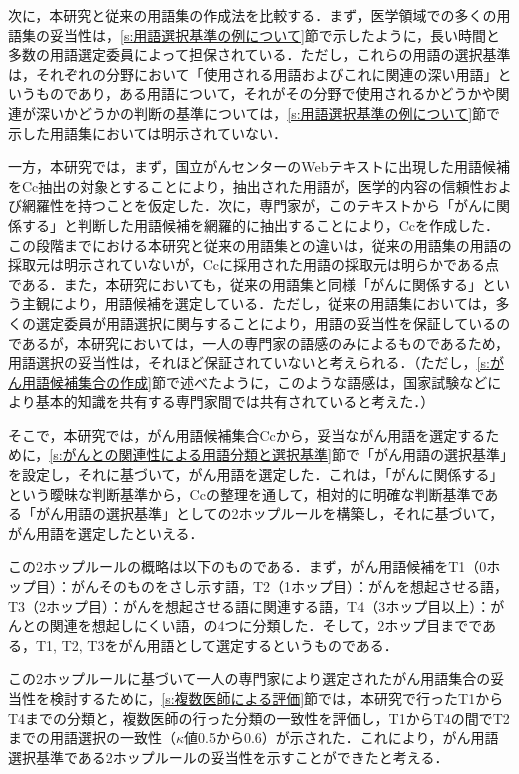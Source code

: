 \documentclass[japanese]{jnlp_1.4}
\begin{document}
次に，本研究と従来の用語集の作成法を比較する．まず，医学領域での多くの用語集の妥当性は，\ref{s:用語選択基準の例について}節で示したように，長い時間と多数の用語選定委員によって担保されている．ただし，これらの用語の選択基準は，それぞれの分野において「使用される用語およびこれに関連の深い用語」というものであり，ある用語について，それがその分野で使用されるかどうかや関連が深いかどうかの判断の基準については，\ref{s:用語選択基準の例について}節で示した用語集においては明示されていない．

一方，本研究では，まず，国立がんセンターのWebテキストに出現した用語候補をCc抽出の対象とすることにより，抽出された用語が，医学的内容の信頼性および網羅性を持つことを仮定した．次に，専門家が，このテキストから「がんに関係する」と判断した用語候補を網羅的に抽出することにより，Ccを作成した．この段階までにおける本研究と従来の用語集との違いは，従来の用語集の用語の採取元は明示されていないが，Ccに採用された用語の採取元は明らかである点である．また，本研究においても，従来の用語集と同様「がんに関係する」という主観により，用語候補を選定している．ただし，従来の用語集においては，多くの選定委員が用語選択に関与することにより，用語の妥当性を保証しているのであるが，本研究においては，一人の専門家の語感のみによるものであるため，用語選択の妥当性は，それほど保証されていないと考えられる．（ただし，\ref{s:がん用語候補集合の作成}節で述べたように，このような語感は，国家試験などにより基本的知識を共有する専門家間では共有されていると考えた．）

そこで，本研究では，がん用語候補集合Ccから，妥当ながん用語を選定するために，\ref{s:がんとの関連性による用語分類と選択基準}節で「がん用語の選択基準」を設定し，それに基づいて，がん用語を選定した．これは，「がんに関係する」という曖昧な判断基準から，Ccの整理を通して，相対的に明確な判断基準である「がん用語の選択基準」としての2ホップルールを構築し，それに基づいて，がん用語を選定したといえる．

この2ホップルールの概略は以下のものである．まず，がん用語候補をT1（0ホップ目）：がんそのものをさし示す語，T2（1ホップ目）：がんを想起させる語，T3（2ホップ目）：がんを想起させる語に関連する語，T4（3ホップ目以上）：がんとの関連を想起しにくい語，の4つに分類した．そして，2ホップ目までである，T1, T2, T3をがん用語として選定するというものである．

この2ホップルールに基づいて一人の専門家により選定されたがん用語集合の妥当性を検討するために，\ref{s:複数医師による評価}節では，本研究で行ったT1からT4までの分類と，複数医師の行った分類の一致性を評価し，T1からT4の間でT2までの用語選択の一致性（$\kappa$値0.5から0.6）が示された．これにより，がん用語選択基準である2ホップルールの妥当性を示すことができたと考える．
\end{document}
